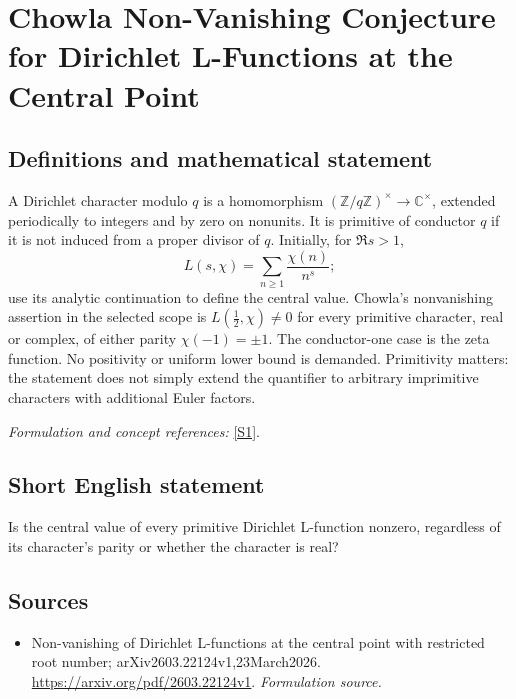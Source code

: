 \documentclass[11pt]{article}
\begin{document}
\section*{\texorpdfstring{Chowla Non-Vanishing Conjecture for Dirichlet L-Functions at the Central Point}{Chowla Non-Vanishing Conjecture for Dirichlet L-Functions at the Central Point}}\label{30006860}
\subsection{Definitions and mathematical statement}
A Dirichlet character modulo $q$ is a homomorphism $({\mathbb{Z}}/q{\mathbb{Z}})^\times\to{\mathbb{C}}^\times$, extended periodically to integers and by zero on nonunits. It is primitive of conductor $q$ if it is not induced from a proper divisor of $q$. Initially, for $\Re s>1$,
\[
 L(s,\chi)=\sum_{n\ge1}\frac{\chi(n)}{n^s};
\]
use its analytic continuation to define the central value. Chowla's nonvanishing assertion in the selected scope is $L(\tfrac12,\chi)\ne0$ for every primitive character, real or complex, of either parity $\chi(-1)=\pm1$. The conductor-one case is the zeta function. No positivity or uniform lower bound is demanded. Primitivity matters: the statement does not simply extend the quantifier to arbitrary imprimitive characters with additional Euler factors.
\par\smallskip\textit{Formulation and concept references:} \href{https://arxiv.org/pdf/2603.22124v1}{[S1]}.

\subsection{Short English statement}
Is the central value of every primitive Dirichlet L-function nonzero, regardless of its character's parity or whether the character is real?
\subsection{Sources}
\begin{itemize}
\item[S1]Non-vanishing of Dirichlet L-functions at the central point with restricted root number; arXiv2603.22124v1,23March2026.
\url{https://arxiv.org/pdf/2603.22124v1}.
\textit{Formulation source.}
\end{itemize}
\end{document}
